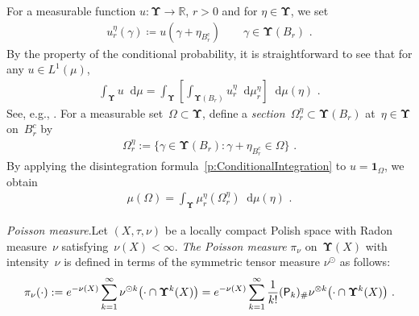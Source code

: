 \documentclass[11pt,letterpaper]{amsart}
\renewcommand{\complement}{\mathrm{c}}
\DeclareMathOperator{\eqdef}{\coloneqq}
\newcommand{\diff}{\mathop{}\!\mathrm{d}}
\newcommand{\quadre}[1]{\left[#1\right]}							%
\newcommand{\R}{{\mathbb R}}
\newcommand{\comma}{\,\,\mathrm{,}\;\,}
\newcommand{\fstop}{\,\,\mathrm{.}}
\newcommand{\QP}{{\mu}}
\newcommand{\dUpsilon}{{\mathbf \Upsilon}}
\newcommand{\U}{\dUpsilon}
\renewcommand{\1}{\mathbf 1}
\numberwithin{equation}{section}
\theoremstyle{plain}
\theoremstyle{definition}
\theoremstyle{remark}
\renewcommand{\paragraph}[1]{\medskip\emph{#1}.\quad}
\newcommand{\quot}{{\sf P}}
\begin{document}
For a measurable function $ u\colon \dUpsilon\to \R$, $r>0$ and for $\eta \in \dUpsilon$, we set 
 \begin{align} \label{e:SEF}
u_{r}^\eta(\gamma)\eqdef  u(\gamma+\eta_{B_r^\complement})  \qquad \gamma\in \dUpsilon(B_r) \fstop
 \end{align}
By  the property of the conditional probability, it is straightforward to see that for any $u \in L^1(\mu)$, 
\begin{align} \label{p:ConditionalIntegration}
\int_{\dUpsilon} u \diff\QP = \int_{\dUpsilon} \quadre{\int_{\dUpsilon(B_r)} u_{r}^\eta \diff \QP^\eta_r }\diff\QP(\eta) \fstop
\end{align}
See, e.g., \cite[Prop.\ 3.44]{LzDSSuz21}. For a measurable set~$\Omega \subset \U$, define a {\it section}~$\Omega_r^\eta \subset \U(B_r)$ at~$\eta \in \U$ on~$B_r^c$ by
 \begin{align} \label{e:SEF2}
 \Omega_r^\eta:=\{\gamma \in \U(B_r): \gamma+\eta_{B_r^c} \in \Omega\} \fstop
 \end{align}
 By applying the disintegration formula~\eqref{p:ConditionalIntegration} to $u=\1_{\Omega}$, we obtain
\begin{align} \label{p:ConditionalIntegration2}
\QP(\Omega)=\int_{\U} \QP_r^\eta(\Omega_r^\eta) \diff \QP(\eta) \fstop
\end{align}

\paragraph{Poisson measure}Let $(X, \tau, \nu)$ be a locally compact Polish space with Radon measure~$\nu$ satisfying~$\nu(X)<\infty$.  {\it The Poisson measure} $\pi_{\nu}$ on~$\U(X)$ with intensity~$\nu$ is defined in terms of the symmetric tensor measure $\nu^{\odot}$ as follows:
\begin{align} \label{d:PS}
\pi_{\nu}(\cdot):=e^{-\nu(X)}\sum_{k=1}^\infty \nu^{\odot k}\bigl(\cdot \cap {\U^k(X)}\bigr)=e^{-\nu(X)}\sum_{k=1}^\infty \frac{1}{k!}(\quot_k)_\#\nu^{\otimes k}\bigl(\cdot \cap {\U^k(X)} \bigr) \fstop
\end{align}
\end{document}

